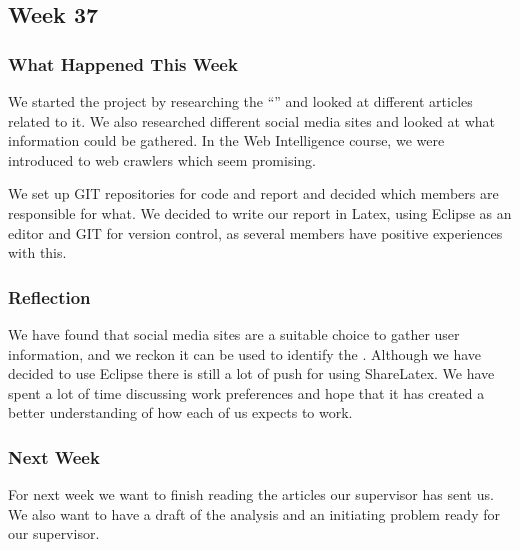 \subsection{Week 37}
\subsubsection{What Happened This Week}
We started the project by researching the ``\fb'' and looked at different
articles related to it. We also researched different social media sites and
looked at what information could be gathered. In the Web Intelligence
course, we were introduced to web crawlers which seem promising.\nl

We set up GIT repositories for code and report and decided which members
are responsible for what. We decided to write our report in Latex, using
Eclipse as an editor and GIT for version control, as several members have
positive experiences with this.

\subsubsection{Reflection}
We have found that social media sites are a suitable choice to gather user
information, and we reckon it can be used to identify the \fb. Although we have
decided to use Eclipse there is still a lot of push for using ShareLatex.
We have spent a lot of time discussing work preferences and hope that it has
created a better understanding of how each of us expects to work.

\subsubsection{Next Week}
For next week we want to finish reading the articles our supervisor has sent us.
We also want to have a draft of the analysis and an initiating problem ready for our
supervisor.